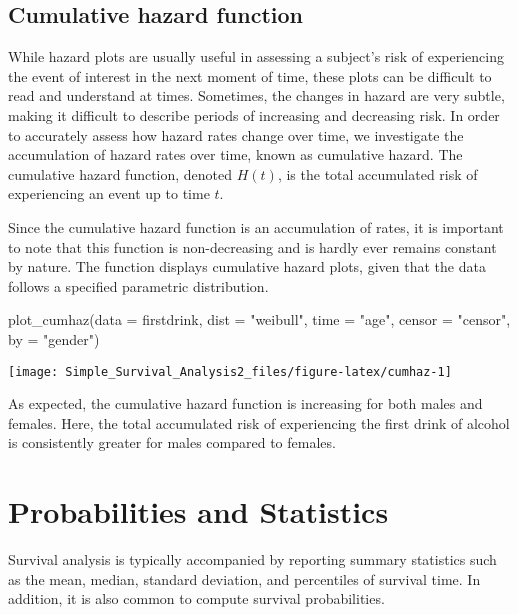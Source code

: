 \hypertarget{cumulative-hazard-function}{%
\subsection{Cumulative hazard
function}\label{cumulative-hazard-function}}

While hazard plots are usually useful in assessing a subject's risk of
experiencing the event of interest in the next moment of time, these
plots can be difficult to read and understand at times. Sometimes, the
changes in hazard are very subtle, making it difficult to describe
periods of increasing and decreasing risk. In order to accurately assess
how hazard rates change over time, we investigate the accumulation of
hazard rates over time, known as cumulative hazard. The cumulative
hazard function, denoted \(H(t)\), is the total accumulated risk of
experiencing an event up to time \(t\).

Since the cumulative hazard function is an accumulation of rates, it is
important to note that this function is non-decreasing and is hardly
ever remains constant by nature. The  function
displays cumulative hazard plots, given that the data follows a
specified parametric distribution.

\begin{Schunk}
\begin{Sinput}
plot_cumhaz(data = firstdrink, dist = "weibull", time = "age", censor = "censor",  by = "gender")
\end{Sinput}

\texttt{[image: Simple\_Survival\_Analysis2\_files/figure-latex/cumhaz-1]} \end{Schunk}

As expected, the cumulative hazard function is increasing for both males
and females. Here, the total accumulated risk of experiencing the first
drink of alcohol is consistently greater for males compared to females.

\hypertarget{probabilities-and-statistics}{%
\section{Probabilities and
Statistics}\label{probabilities-and-statistics}}

Survival analysis is typically accompanied by reporting summary
statistics such as the mean, median, standard deviation, and percentiles
of survival time. In addition, it is also common to compute survival
probabilities.

